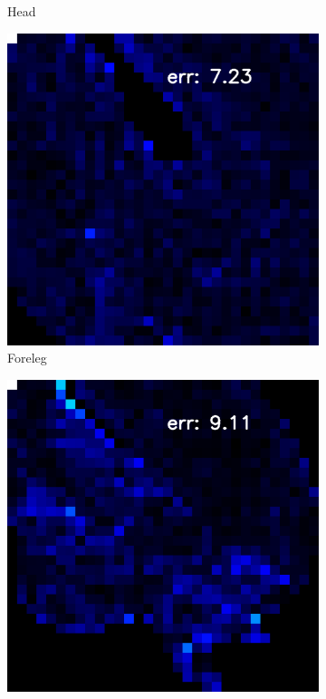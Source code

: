 \begin{figure}[th]
\begin{subfigure}[b]{0.18\linewidth}
		\caption{Head}
	\end{subfigure}
	\begin{subfigure}[b]{0.18\linewidth}
		\includegraphics[width=\linewidth]{./Figures/gcnn_synthetic/eval_7_32_12_error.png}
		\caption{Foreleg}
	\end{subfigure}
	\begin{subfigure}[b]{0.18\linewidth}
		\includegraphics[width=\linewidth]{./Figures/gcnn_synthetic/eval_7_42_-28_error.png}

\end{subfigure}
\end{figure}
